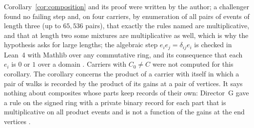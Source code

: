 Corollary~\ref{cor:composition} and its proof were written by the author; a challenger found no failing step and, on four carriers, by enumeration of all pairs of events of length three (up to $65{,}536$ pairs), that exactly the rules named are multiplicative, and that at length two some mixtures are multiplicative as well, which is why the hypothesis asks for large lengths; the algebraic step $e_ie_j=\delta_{ij}e_i$ is checked in Lean~4 with Mathlib over any commutative ring, and its consequence that each $e_i$ is $0$ or $1$ over a domain \cite{comp4s}. Carriers with $C_0\ne C$ were not computed for this corollary. The corollary concerns the product of a carrier with itself in which a pair of walks is recorded by the product of its gains at a pair of vertices. It says nothing about composites whose parts keep records of their own: Director~G gave a rule on the signed ring with a private binary record for each part that is multiplicative on all product events and is not a function of the gains at the end vertices \cite{dgz1}.

